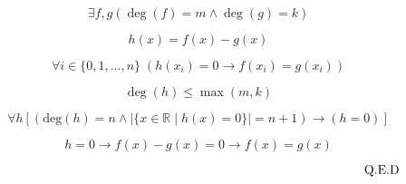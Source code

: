    \[
   \exists f, g \left( \deg(f) = m \land \deg(g) = k \right)
   \]

   \[
   h(x) = f(x) - g(x)
   \]

   \[
   \forall i \in \{0, 1, \ldots, n\} \; (h(x_i) = 0 \rightarrow f(x_i) = g(x_i))
   \]

   \[
   \deg(h) \leq \max(m, k)
   \]

   \[ \forall h \left[ (\text{deg}(h) = n \wedge \left| \{ x \in \mathbb{R} \mid h(x) = 0 \} \right| = n + 1) \rightarrow (h = 0) \right] \]

   \[
   h = 0 \rightarrow f(x) - g(x) = 0 \rightarrow f(x) = g(x)
   \]

   \[
   \text{ \hspace{10cm} Q.E.D}
   \]